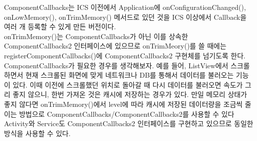 ComponentCallbacks는 ICS 이전에서 Application에 onConfigurationChanged(), onLowMemory(), onTrimMemory() 메서드로 있던 것을 ICS 이상에서 Callback을 여러 개 등록할 수 있게 만든 버전이다.\\

onTrimMemory()는 ComponentCallbacks가 아닌 이를 상속한 ComponentCallbacks2 인터페이스에 있으므로 onTrimMeory()를 쓸 때에는 registerComponentCallbacks()에 ComponentCallbacks2 구현체를 넘기도록 한다.\\

ComponentCallbacks가 필요한 경우를 생각해보자.
예를 들어, ListView에서 스크롤하면서 현재 스크롤된 화면에 맞게 네트워크나 DB를 통해서 데이터를 불러오는 기능이 있다.
이때 이전에 스크롤했던 위치로 돌아갈 때 다시 데이터를 불러오면 속도가 그리 좋지 않으니, 한번 가져온 것은 캐시에 저장하는 경우가 있다.
만일 메모리 상태가 좋지 않다면 onTrimMemory()에서 level에 따라 캐시에 저장된 데이터량을 조금씩 줄이는 방법으로 ComponentCallbacks/ComponentCallbacks2를 사용할 수 있다
Activity와 Service도 ComponentCallbacks2 인터페이스를 구현하고 있으므로 동일한 방식을 사용할 수 있다.\\

